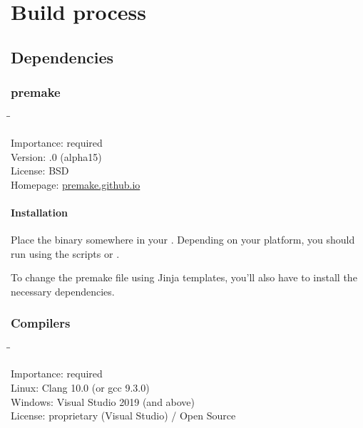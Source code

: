 \chapter{Build process}
\label{chap:build_process}

\section{Dependencies}
\label{sec:dependencies}

\subsection{premake}
\label{sec:dependencies_premake}

\begin{tabbing}
  \hspace*{6em}\=\=\kill

  Importance:  \> required \\
  Version:     .0 (alpha15) \\
  License:     \> BSD \\
  Homepage:    \> \href{https://premake.github.io/}{premake.github.io}
\end{tabbing}

\subsubsection{Installation}

Place the binary somewhere in your .  Depending on your
platform, you should run  using the scripts
 or
.

To change the premake file using Jinja templates, you'll also have to
install the necessary dependencies.

\subsection{Compilers}

\begin{tabbing}
  \hspace*{6em}\=\=\kill

  Importance:  \> required \\
  Linux:       \> Clang 10.0 (or gcc 9.3.0) \\
  Windows:     \> Visual Studio 2019 (and above) \\
  License:     \> proprietary (Visual Studio) / Open Source \\
\end{tabbing}

